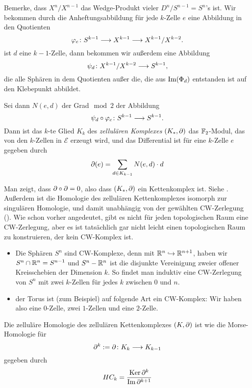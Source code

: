 \begin{definition}
    \label{def: zellulaerer kettenkomplex}
    Bemerke, dass $X^n / X^{n - 1}$ das Wedge-Produkt vieler $D^n / S^{n-1} = S^n$'s ist. 
    Wir bekommen durch die Anheftungsabbildung für jede $k$-Zelle $e$ eine Abbildung in den 
    Quotienten
    \[ \varphi_e \colon S^{k-1} \longrightarrow X^{k - 1} \longrightarrow X^{k - 1} / X^{k - 2} . \]
    ist $d$ eine $k - 1$-Zelle, dann bekommen wir außerdem eine Abbildung 
    \[ \psi_d \colon X^{k - 1} / X^{k - 2} \longrightarrow S^{k - 1} , \]
    die alle Sphären in dem Quotienten außer die, die aus ${ \operatorname{Im} } (\Phi_d)$ entstanden ist
    auf den Klebepunkt abbildet.

    Sei dann $N(e, d)$ der Grad$\mod 2$ der Abbildung
    \[ \psi_d \circ \varphi_c \colon S^{k - 1} \longrightarrow S^{k - 1} . \]
    Dann ist das $k$-te Glied $K_k$ des \textit{zellulären Komplexes} $(K_{\ast}, { \partial })$ das 
    ${ \mathbb F }_2$-Modul, das von den $k$-Zellen in $\mathcal{E}$ erzeugt wird, und das Differential ist für 
    eine $k$-Zelle $e$ gegeben durch
    \[ { \partial } (e) = \sum_{d \in K_{k  - 1}} N(e, d) \cdot d \] 
\end{definition}

\begin{remark}
    Man zeigt, dass ${ \partial } \circ { \partial } = 0$, also dass $(K_{\ast}, { \partial })$ ein Kettenkomplex ist. 
    Siehe \cite{dold}. Außerdem ist die Homologie des zellulären Kettenkomplexes isomorph zur 
    singulären Homologie, und damit unabhängig von der gewählten CW-Zerlegung (\cite{hatcher}). 
    Wie schon vorher angedeutet, gibt es nicht für jeden topologischen Raum eine CW-Zerlegung,
    aber es ist tatsächlich gar nicht leicht einen topologischen Raum zu konstruieren, der 
    kein CW-Komplex ist.
\end{remark}

\begin{example}
    \begin{itemize}
        \item Die Sphären $S^n$ sind CW-Komplexe, denn mit ${ \mathbb R }^n \hookrightarrow { \mathbb R }^{n + 1}$,
            haben wir $S^n \cap { \mathbb R }^n = S^{n - 1}$ und $S^n - { \mathbb R }^n$ ist die disjunkte Vereinigung
            zweier offener Kreisschebien der Dimension $k$. So findet man induktiv eine CW-Zerlegung
            von $S^n$ mit zwei $k$-Zellen für jedes $k$ zwischen $0$ und $n$.
        \item der Torus ist (zum Beispiel) auf folgende Art ein CW-Komplex:
            Wir haben also eine $0$-Zelle, zwei $1$-Zellen und eine $2$-Zelle.
    \end{itemize}
\end{example}

\begin{definition}
    Die zelluläre Homologie des zellulären Kettenkomplexes $(K, { \partial })$ ist wie die Morse-Homologie 
    für 
    \[ { \partial }^k := { \partial } \colon K_k \longrightarrow K_{k - 1} \]
    gegeben durch 
    \[ HC_k = \frac{ { \operatorname{Ker} } \, { \partial }^k }{ { \operatorname{Im} } \, { \partial }^{k + 1} } \]
\end{definition}
